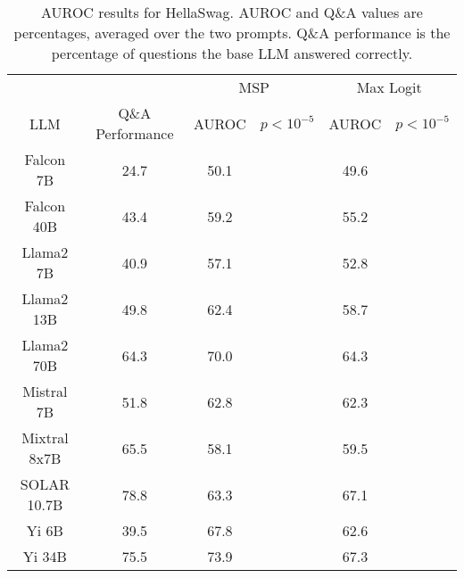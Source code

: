 \begin{table*}
\centering
\begin{tabular}{c|c|c|c|c|c}
& & \multicolumn{2}{c|}{MSP} & \multicolumn{2}{c}{Max Logit} \\ 
LLM & Q\&A Performance & AUROC & $p < 10^{-5}$ & AUROC & $p < 10^{-5}$\\ \hline
Falcon 7B & 24.7 & 50.1 &  & 49.6 & \\
Falcon 40B & 43.4 & 59.2 &  & 55.2 & \\
Llama2 7B & 40.9 & 57.1 &  & 52.8 & \\
Llama2 13B & 49.8 & 62.4 &  & 58.7 & \\
Llama2 70B & 64.3 & 70.0 &  & 64.3 & \\
Mistral 7B & 51.8 & 62.8 &  & 62.3 & \\
Mixtral 8x7B & 65.5 & 58.1 &  & 59.5 & \\
SOLAR 10.7B & 78.8 & 63.3 &  & 67.1 & \\
Yi 6B & 39.5 & 67.8 &  & 62.6 & \\
Yi 34B & 75.5 & 73.9 &  & 67.3 & \\
\hline
\end{tabular}
\caption{AUROC results for HellaSwag. AUROC and Q\&A values are percentages, averaged over the two prompts. Q\&A performance is the percentage of questions the base LLM answered correctly.}
\label{tab:hellaswag_auroc}
\end{table*}
